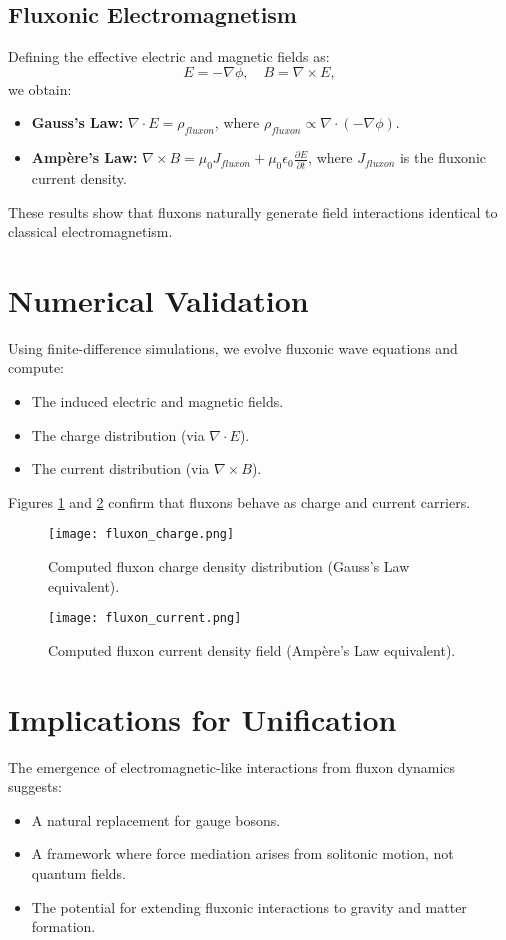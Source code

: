 \documentclass{article}
\begin{document}
\subsection{Fluxonic Electromagnetism}
Defining the effective electric and magnetic fields as:
\begin{equation}
E = -\nabla \phi, \quad B = \nabla \times E,
\end{equation}
we obtain:
\begin{itemize}
    \item \textbf{Gauss's Law:} $\nabla \cdot E = \rho_{fluxon}$, where $\rho_{fluxon} \propto \nabla \cdot (-\nabla \phi)$.
    \item \textbf{Ampère's Law:} $\nabla \times B = \mu_0 J_{fluxon} + \mu_0 \epsilon_0 \frac{\partial E}{\partial t}$, where $J_{fluxon}$ is the fluxonic current density.
\end{itemize}
These results show that fluxons naturally generate field interactions identical to classical electromagnetism.

\section{Numerical Validation}
Using finite-difference simulations, we evolve fluxonic wave equations and compute:
\begin{itemize}
    \item The induced electric and magnetic fields.
    \item The charge distribution (via $\nabla \cdot E$).
    \item The current distribution (via $\nabla \times B$).
\end{itemize}
Figures \ref{fig:charge} and \ref{fig:current} confirm that fluxons behave as charge and current carriers.

\begin{figure}[h]
    \centering
    \texttt{[image: fluxon\_charge.png]}
    \caption{Computed fluxon charge density distribution (Gauss's Law equivalent).}
    \label{fig:charge}
\end{figure}

\begin{figure}[h]
    \centering
    \texttt{[image: fluxon\_current.png]}
    \caption{Computed fluxon current density field (Ampère's Law equivalent).}
    \label{fig:current}
\end{figure}

\section{Implications for Unification}
The emergence of electromagnetic-like interactions from fluxon dynamics suggests:
\begin{itemize}
    \item A natural replacement for gauge bosons.
    \item A framework where force mediation arises from solitonic motion, not quantum fields.
    \item The potential for extending fluxonic interactions to gravity and matter formation.
\end{itemize}
\end{document}

